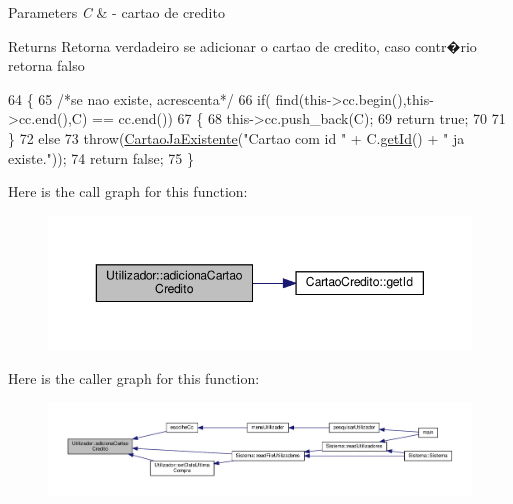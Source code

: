 \begin{DoxyParams}{Parameters}
{\em C} & -\/ cartao de credito \\
\hline
\end{DoxyParams}
\begin{DoxyReturn}{Returns}
Retorna verdadeiro se adicionar o cartao de credito, caso contr�rio retorna falso 
\end{DoxyReturn}

\begin{DoxyCode}
64 \{
65     \textcolor{comment}{/*se nao existe, acrescenta*/}
66     \textcolor{keywordflow}{if}( find(this->cc.begin(),this->cc.end(),C) == cc.end())
67     \{
68         this->cc.push\_back(C);
69         \textcolor{keywordflow}{return} \textcolor{keyword}{true};
70 
71     \}
72     \textcolor{keywordflow}{else}
73         \textcolor{keywordflow}{throw}(\hyperlink{classCartaoJaExistente}{CartaoJaExistente}(\textcolor{stringliteral}{"Cartao com id "} + C.\hyperlink{classCartaoCredito_ab59d60e4d155e7f29aef888ea3139ee5}{getId}() + \textcolor{stringliteral}{" ja existe."}));
74     \textcolor{keywordflow}{return} \textcolor{keyword}{false};
75 \}
\end{DoxyCode}
Here is the call graph for this function\+:
\nopagebreak
\begin{figure}[H]
\begin{center}
\leavevmode
\includegraphics[width=350pt]{classUtilizador_a60b1025ffe94b9f2414f54cc94662cc9_cgraph}
\end{center}
\end{figure}
Here is the caller graph for this function\+:
\nopagebreak
\begin{figure}[H]
\begin{center}
\leavevmode
\includegraphics[width=350pt]{classUtilizador_a60b1025ffe94b9f2414f54cc94662cc9_icgraph}
\end{center}
\end{figure}
\mbox{\label{classUtilizador_ac08a744b9d9d2aca0bd22c60e0beaa83}} 
